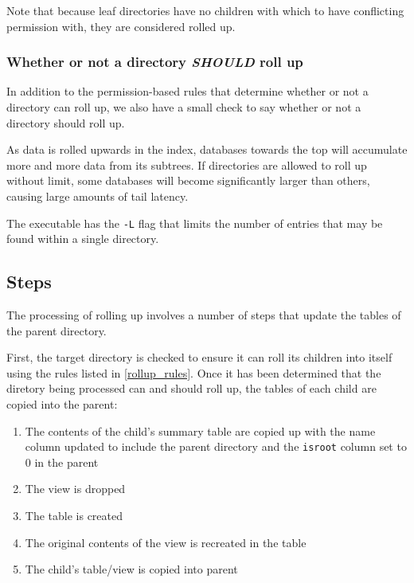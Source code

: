Note that because leaf directories have no children with which to have
conflicting permission with, they are considered rolled up.

\subsubsection{Whether or not a directory {\it SHOULD} roll up}
In addition to the permission-based rules that determine whether or
not a directory can roll up, we also have a small check to say whether
or not a directory should roll up.

As data is rolled upwards in the index, databases towards the top will
accumulate more and more data from its subtrees. If directories are
allowed to roll up without limit, some databases will become
significantly larger than others, causing large amounts of tail latency.

The \rollup executable has the \texttt{-L} flag that limits the number
of entries that may be found within a single directory.

\subsection{Steps}
The processing of rolling up involves a number of steps that update
the tables of the parent directory.

First, the target directory is checked to ensure it can roll its
children into itself using the rules listed in
\ref{rollup_rules}. Once it has been determined that the diretory
being processed can and should roll up, the tables of each child are
copied into the parent:

\begin{enumerate}
  \item The contents of the child's summary table are copied up with
    the name column updated to include the parent directory and the
    \texttt{isroot} column set to 0 in the parent
  \item The \pentries view is dropped
  \item The \pentries table is created
  \item The original contents of the \pentries view is
    recreated in the \pentries table
  \item The child's \pentries table/view is copied into parent
\end{enumerate}

